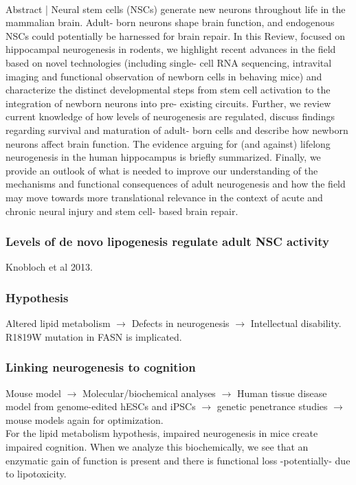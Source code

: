 \begin{itemize}
\begin{itemize}
\\Abstract | Neural stem cells (NSCs) generate new neurons throughout life in the mammalian brain.
Adult- born neurons shape brain function, and endogenous NSCs could potentially be harnessed
for brain repair. In this Review, focused on hippocampal neurogenesis in rodents, we highlight
recent advances in the field based on novel technologies (including single- cell RNA sequencing,
intravital imaging and functional observation of newborn cells in behaving mice) and characterize
the distinct developmental steps from stem cell activation to the integration of newborn neurons
into pre- existing circuits. Further, we review current knowledge of how levels of neurogenesis are
regulated, discuss findings regarding survival and maturation of adult- born cells and describe
how newborn neurons affect brain function. The evidence arguing for (and against) lifelong
neurogenesis in the human hippocampus is briefly summarized. Finally, we provide an outlook of
what is needed to improve our understanding of the mechanisms and functional consequences
of adult neurogenesis and how the field may move towards more translational relevance in the
context of acute and chronic neural injury and stem cell- based brain repair.

\subsubsection{Levels of de novo lipogenesis regulate adult NSC activity}
Knobloch et al 2013.

\subsubsection{Hypothesis}
Altered lipid metabolism $\rightarrow$ Defects in neurogenesis $\rightarrow$ Intellectual disability. R1819W mutation in FASN is implicated.
\subsubsection{Linking neurogenesis to cognition}
Mouse model $\rightarrow$ Molecular/biochemical analyses $\rightarrow$ Human tissue disease model from genome-edited hESCs and iPSCs $\rightarrow$ genetic penetrance studies $\rightarrow$ mouse models again for optimization.
\\For the lipid metabolism hypothesis, impaired neurogenesis in mice create impaired cognition. When we analyze this biochemically, we see that an enzymatic gain of function is present and there is functional loss -potentially- due to lipotoxicity.

\end{itemize}
\end{itemize}
